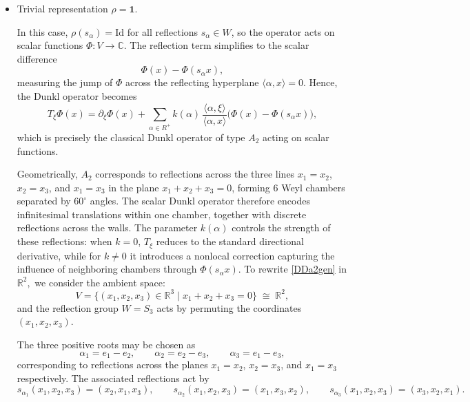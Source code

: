 \documentclass[12pt]{article}
\newcommand{\Id}{\mathrm{Id}}
\newcommand{\1}{\mathbbm{1}}
\theoremstyle{definition}
\begin{document}
\begin{itemize}
\item[(i)] Trivial representation $\rho=\mathbf{1}$.

In this case, $\rho(s_\alpha) = \Id$ for all reflections $s_\alpha \in W$, so the
operator acts on scalar functions $\Phi : V \to \mathbb{C}$. The reflection term
simplifies to the scalar difference
\[
  \Phi(x) - \Phi(s_\alpha x),
\]
measuring the jump of $\Phi$ across the reflecting hyperplane
$\langle \alpha, x \rangle = 0$. Hence, the Dunkl operator becomes
\begin{equation}\label{DDa2gen}
  T_\xi \Phi(x)
  = \partial_\xi \Phi(x)
  + \sum_{\alpha\in R^+} k(\alpha)\,
    \frac{\langle \alpha,\xi\rangle}{\langle \alpha,x\rangle}
    \big(\Phi(x)-\Phi(s_\alpha x)\big),
\end{equation}
which is precisely the classical Dunkl operator of type $A_2$ acting on scalar
functions.

Geometrically, $A_2$ corresponds to reflections across the three lines
$x_1=x_2$, $x_2=x_3$, and $x_1=x_3$ in the plane $x_1+x_2+x_3=0$, forming $6$
Weyl chambers separated by $60^\circ$ angles. The scalar Dunkl operator therefore
encodes infinitesimal translations within one chamber, together with discrete
reflections across the walls. The parameter $k(\alpha)$ controls the strength of
these reflections: when $k=0$, $T_\xi$ reduces to the standard directional derivative,
while for $k\neq 0$ it introduces a nonlocal correction capturing the influence
of neighboring chambers through $\Phi(s_\alpha x)$.
To rewrite \eqref{DDa2gen} in $\mathbb{R}^2,$ we consider the ambient space:
\begin{equation}\label{Va2}
  V = \{(x_1,x_2,x_3)\in\mathbb{R}^3 \;|\; x_1+x_2+x_3=0\}
  \;\cong\; \mathbb{R}^2,
\end{equation}
and the reflection group $W=S_3$ acts by permuting the coordinates $(x_1,x_2,x_3)$.

The three positive roots may be chosen as
\[
  \alpha_1 = e_1 - e_2, \qquad
  \alpha_2 = e_2 - e_3, \qquad
  \alpha_3 = e_1 - e_3,
\]
corresponding to reflections across the planes
$x_1 = x_2$, $x_2 = x_3$, and $x_1 = x_3$ respectively.  The associated reflections act by
\[
  s_{\alpha_1}(x_1,x_2,x_3) = (x_2,x_1,x_3), \qquad
  s_{\alpha_2}(x_1,x_2,x_3) = (x_1,x_3,x_2), \qquad
  s_{\alpha_3}(x_1,x_2,x_3) = (x_3,x_2,x_1).
\]


\end{itemize}
\end{document}
